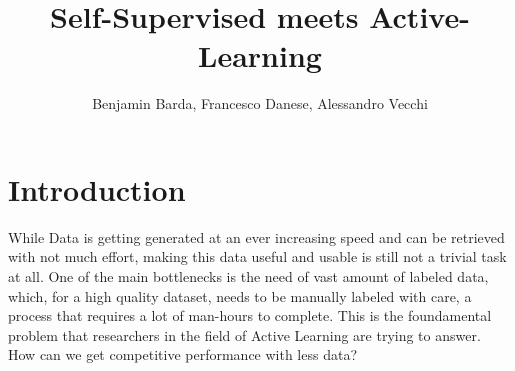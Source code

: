 \documentclass{article}
\begin{document}
\author{Benjamin Barda, Francesco Danese, Alessandro Vecchi}
\title{\vspace{-2cm}\textbf{Self-Supervised meets Active-Learning}}
\maketitle

\section{Introduction}
\begin{flushleft}
While Data is getting generated at an ever increasing speed and can be retrieved with not much effort,
making this data useful and usable is still not a trivial task at all.
One of the main bottlenecks is the need of vast amount of labeled data, which, for a high quality dataset,
needs to be manually labeled with care, a process that requires a lot of man-hours to complete. 
This is the foundamental problem that researchers in the field of Active Learning are trying to answer. 
How can we get competitive performance with less data?
\end{flushleft}
\end{document}
